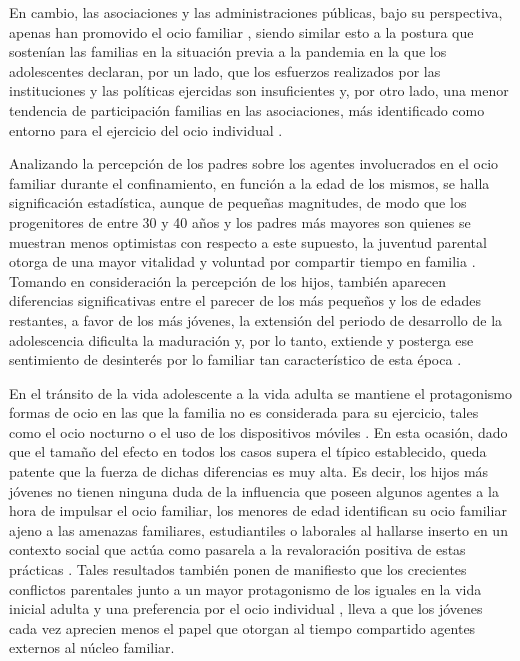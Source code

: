 \documentclass[spanish]{textolivre}
\begin{document}
En cambio, las asociaciones y las administraciones públicas, bajo su perspectiva, apenas han promovido el ocio familiar , siendo similar esto a la postura que sostenían las familias en la situación previa a la pandemia en la que los adolescentes declaran, por un lado, que los esfuerzos realizados por las instituciones y las políticas ejercidas son insuficientes y, por otro lado, una menor tendencia de participación familias en las asociaciones, más identificado como entorno para el ejercicio del ocio individual \cite{alvarez2020}.

Analizando la percepción de los padres sobre los agentes involucrados en el ocio familiar durante el confinamiento, en función a la edad de los mismos, se halla significación estadística, aunque de pequeñas magnitudes, de modo que los progenitores de entre 30 y 40 años y los padres más mayores son quienes se muestran menos optimistas con respecto a este supuesto, la juventud parental otorga de una mayor vitalidad y voluntad por compartir tiempo en familia \cite{roeters2016}. Tomando en consideración la percepción de los hijos, también aparecen diferencias significativas entre el parecer de los más pequeños y los de edades restantes, a favor de los más jóvenes, la extensión del periodo de desarrollo de la adolescencia dificulta la maduración y, por lo tanto, extiende y posterga ese sentimiento de desinterés por lo familiar tan característico de esta época \cite{hernandez2017}. 

En el tránsito de la vida adolescente a la vida adulta se mantiene el protagonismo formas de ocio en las que la familia no es considerada para su ejercicio, tales como el ocio nocturno \cite{lavielle-sotomayor2014} o el uso de los dispositivos móviles \cite{alfarogonzales2015}. En esta ocasión, dado que el tamaño del efecto en todos los casos supera el típico establecido, queda patente que la fuerza de dichas diferencias es muy alta. Es decir, los hijos más jóvenes no tienen ninguna duda de la influencia que poseen algunos agentes a la hora de impulsar el ocio familiar, los menores de edad identifican su ocio familiar ajeno a las amenazas familiares, estudiantiles o laborales al hallarse inserto en un contexto social que actúa como pasarela a la revaloración positiva de estas prácticas \cite{sanzarazuri2018}. Tales resultados también ponen de manifiesto que los crecientes conflictos parentales \cite{cummings2008} junto a un mayor protagonismo de los iguales en la vida inicial adulta \cite{caneroperez2019} y una preferencia por el ocio individual \cite{urgilesleon2018}, lleva a que los jóvenes cada vez aprecien menos el papel que otorgan al tiempo compartido agentes externos al núcleo familiar. 
\end{document}
